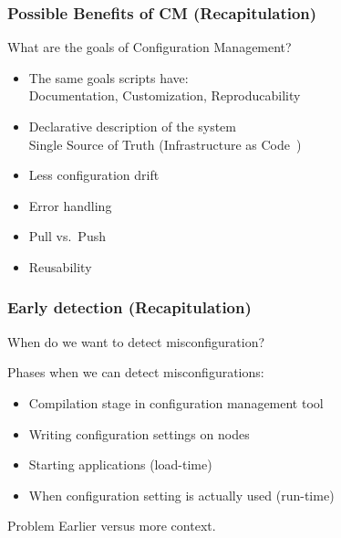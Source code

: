 \begin{frame}
	\frametitle{Possible Benefits of CM (Recapitulation)}

	\begin{task}
	What are the goals of Configuration Management?
	\end{task}

	\pause

	\begin{itemize} %
	\item The same goals scripts have: \\
		Documentation, Customization, Reproducability
	\item Declarative description of the system \\
		Single Source of Truth 
		(Infrastructure as Code~\cite{waldemar2013testing})
	\item Less configuration drift
	\item Error handling
	\item Pull vs.\ Push
	\item Reusability
	\end{itemize}
\end{frame}

\begin{frame}
	\frametitle{Early detection (Recapitulation)}
	\begin{task}
	When do we want to detect misconfiguration?
	\end{task}

	\pause

	Phases when we can detect misconfigurations:
	\begin{itemize} %
	\item Compilation stage in configuration management tool
	\item Writing configuration settings on nodes
	\item Starting applications (load-time)
	\item When configuration setting is actually used (run-time)
	\end{itemize}

	\pause[\thebeamerpauses]

	\begin{alertblock}{Problem}
	Earlier versus more context.
	\end{alertblock}
\end{frame}


